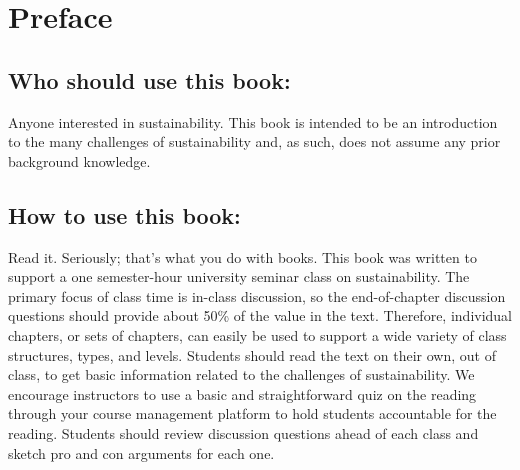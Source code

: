 

{
\pagestyle{plain}
\tableofcontents
}

\clearpage
 
 
 
 
\blankpage

{
\chapter*{Preface}
\thispagestyle{plain}

\noindent
\section{Who should use this book:} Anyone interested in sustainability. 
This book is intended to be an introduction to the many challenges of 
sustainability and, as such, does not assume any prior background knowledge. \\

\section{How to use this book:} Read it. Seriously; that's what you do with books.
This book was written to support a one semester-hour university seminar class
on sustainability. The primary focus of class time is in-class discussion, so 
the end-of-chapter discussion questions should provide about 50\% of the value
in the text. Therefore, individual chapters, or sets of chapters, can easily be
used to support a wide variety of class structures, types, and levels.
Students should read the text on their own, out of class, to get 
basic information related to  the challenges of sustainability. We encourage 
instructors to use a basic and straightforward quiz on the reading through your 
course management platform to hold students accountable for the reading. 
Students should review discussion questions ahead of each class and sketch 
pro and con arguments for each one. \\

}
